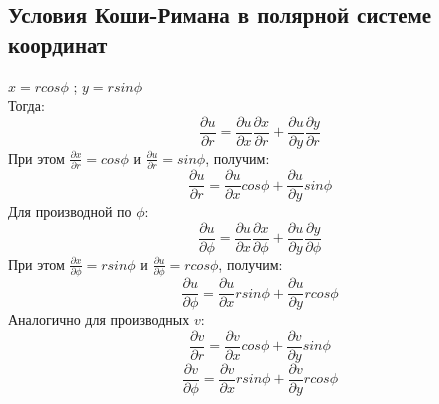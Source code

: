 \documentclass{article}
\begin{document}
            \subsection{Условия Коши-Римана в полярной системе координат}
            $x=r cos \phi $ ; $y= r sin \phi$\\
          Тогда:
          \begin{equation}
            \frac{\partial u}{\partial r}=\frac{\partial u}{\partial x} \frac{\partial x}{\partial r} + \frac{\partial u}{\partial y} \frac{\partial y}{\partial r}  
          \end{equation}
          При этом $\frac{\partial x}{\partial r}=cos \phi$ и $\frac{\partial u}{\partial r}=sin \phi$, получим:
          \begin{equation}
            \frac{\partial u}{\partial r}=\frac{\partial u}{\partial x} cos \phi + \frac{\partial u}{\partial y} sin \phi  
          \end{equation}
          Для производной по $\phi$:
          \begin{equation}
            \frac{\partial u}{\partial \phi}=\frac{\partial u}{\partial x} \frac{\partial x}{\partial \phi} + \frac{\partial u}{\partial y} \frac{\partial y}{\partial \phi}  
          \end{equation}
          При этом $\frac{\partial x}{\partial \phi}=r sin \phi$ и $\frac{\partial u}{\partial \phi}=r cos \phi$, получим:
          \begin{equation}
            \frac{\partial u}{\partial \phi}=\frac{\partial u}{\partial x} r sin \phi + \frac{\partial u}{\partial y} r cos \phi  
          \end{equation}
        Аналогично для производных $v$:
          \begin{equation}
            \frac{\partial v}{\partial r}=\frac{\partial v}{\partial x} cos \phi + \frac{\partial v}{\partial y} sin \phi  
          \end{equation}
          \begin{equation}
            \frac{\partial v}{\partial \phi}=\frac{\partial v}{\partial x} r sin \phi + \frac{\partial v}{\partial y} r cos \phi  
          \end{equation}
\end{document}
